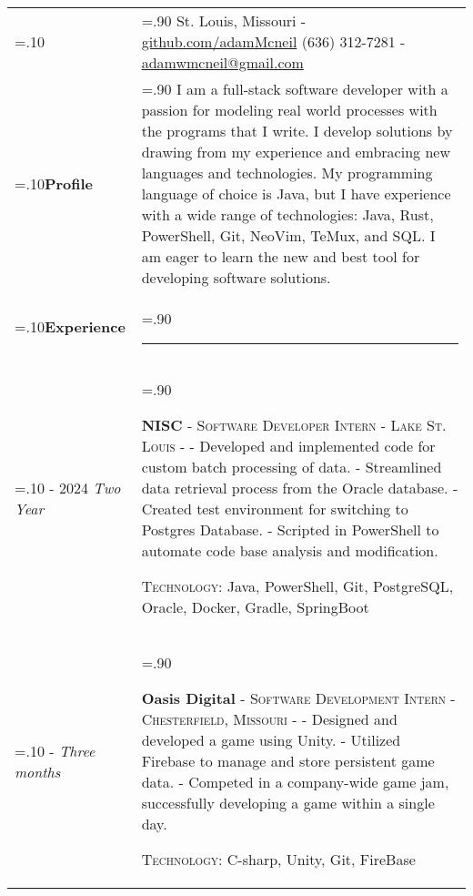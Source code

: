 \documentclass[10pt]{article}
\newcommand{\timeFrame}[3] {
  \if\relax\detokenize{#2}\relax
    #1
  \else
    #1 - #2
  \fi
  \newline
  \scriptsize \textit{#3}
}
\newcommand{\entry}[6] {
  \textbf{#1}
  \if\relax\detokenize{#2}\relax
  \else
       - \textsc{#2}
  \fi
  \if\relax\detokenize{#3}\relax
  \else
      - \textsc{#3}
  \fi
  \if\relax\detokenize{#4}\relax
  \else
      - \href{https://#4}{#4}
  \fi
  \newline #5
  \if\relax\detokenize{#6}\relax
  \else
      \newline \textsc{Technology:} #6
  \fi
  \\
}
\newcommand{\horizontalLine}[0] {
    \noindent\rule{.90\linewidth}{0.4pt}
}
\begin{document}

\begin{tabularx}{\linewidth}{>{\hsize=.10\hsize}X>{\hsize=.90\hsize}X}

{\bfseries\large Adam McNeil} &
St. Louis, Missouri - \href{https://github.com/adamMcneil}{github.com/adamMcneil}\newline
{(636) 312-7281 \hspace{5.5mm} - \href{mailto:adamwmcneil@gmail.com}{adamwmcneil@gmail.com}} \\[5pt]

\textbf{Profile} &
{I am a full-stack software developer with a passion for modeling real world processes with the programs that I write.
 I develop solutions by drawing from my experience and embracing new languages and technologies.
 My programming language of choice is Java, but I have experience with a wide range of technologies: Java, Rust, PowerShell, Git, NeoVim, TeMux, and SQL.
 I am eager to learn the new and best tool for developing software solutions.
 \newline
} \\

\textbf{Experience} & \horizontalLine \\

\timeFrame{2023}{2024}{Two Year} &
\entry{NISC}
  {Software Developer Intern}
  {Lake St. Louis}
  {}
  {
  - Developed and implemented code for custom batch processing of data. \newline
  - Streamlined data retrieval process from the Oracle database. \newline
  - Created test environment for switching to Postgres Database. \newline
  - Scripted in PowerShell to automate code base analysis and modification.
  }
  {Java, PowerShell, Git, PostgreSQL, Oracle, Docker, Gradle, SpringBoot \newline}

\timeFrame{2022}{}{Three months} &
\entry{Oasis Digital}
  {Software Development Intern}
  {Chesterfield, Missouri}
  {}
  {
  - Designed and developed a game using Unity. \newline
  - Utilized Firebase to manage and store persistent game data. \newline
  - Competed in a company-wide game jam, successfully developing a game within a single day.
  }
  {C-sharp, Unity, Git, FireBase \newline}



\end{tabularx}
\end{document}
